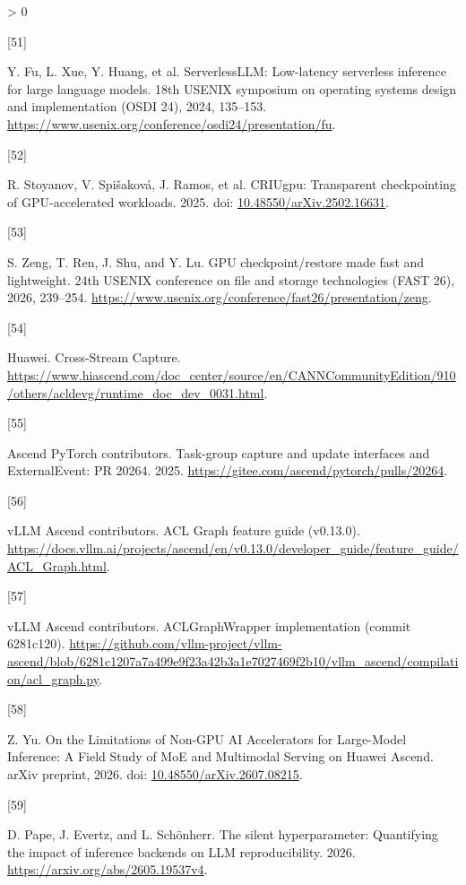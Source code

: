 \documentclass[
  11pt,
  UTF8]{ctexart}
\newlength{\cslhangindent}
\newlength{\csllabelwidth}
\newenvironment{CSLReferences}[2] %
 {%
  \setlength{\parindent}{0pt}
  \ifodd #1 \everypar{\setlength{\hangindent}{\cslhangindent}}\ignorespaces\fi
  \ifnum #2 > 0
  \setlength{\parskip}{#2\baselineskip}
  \fi
 }%
 {}
\newcommand{\CSLLeftMargin}[1]{\parbox[t]{\csllabelwidth}{#1}}
\newcommand{\CSLRightInline}[1]{\parbox[t]{\linewidth - \csllabelwidth}{#1}\break}
\begin{document}
\begin{CSLReferences}{0}{0}
\leavevmode{}%
\CSLLeftMargin{{[}51{]} }
\CSLRightInline{Y. Fu, L. Xue, Y. Huang, et al. ServerlessLLM:
Low-latency serverless inference for large language models. 18th USENIX
symposium on operating systems design and implementation (OSDI 24),
2024, 135--153.
\url{https://www.usenix.org/conference/osdi24/presentation/fu}.}

\leavevmode{}%
\CSLLeftMargin{{[}52{]} }
\CSLRightInline{R. Stoyanov, V. Spišaková, J. Ramos, et al. CRIUgpu:
Transparent checkpointing of GPU-accelerated workloads. 2025. doi:
\href{https://doi.org/10.48550/arXiv.2502.16631}{10.48550/arXiv.2502.16631}.}

\leavevmode{}%
\CSLLeftMargin{{[}53{]} }
\CSLRightInline{S. Zeng, T. Ren, J. Shu, and Y. Lu. GPU
checkpoint/restore made fast and lightweight. 24th USENIX conference on
file and storage technologies (FAST 26), 2026, 239--254.
\url{https://www.usenix.org/conference/fast26/presentation/zeng}.}

\leavevmode{}%
\CSLLeftMargin{{[}54{]} }
\CSLRightInline{Huawei. {Cross-Stream Capture}.
\url{https://www.hiascend.com/doc_center/source/en/CANNCommunityEdition/910/others/acldevg/runtime_doc_dev_0031.html}.}

\leavevmode{}%
\CSLLeftMargin{{[}55{]} }
\CSLRightInline{Ascend PyTorch contributors. {Task-group capture and
update interfaces and ExternalEvent: PR 20264}. 2025.
\url{https://gitee.com/ascend/pytorch/pulls/20264}.}

\leavevmode{}%
\CSLLeftMargin{{[}56{]} }
\CSLRightInline{vLLM Ascend contributors. {ACL Graph feature guide
(v0.13.0)}.
\url{https://docs.vllm.ai/projects/ascend/en/v0.13.0/developer_guide/feature_guide/ACL_Graph.html}.}

\leavevmode{}%
\CSLLeftMargin{{[}57{]} }
\CSLRightInline{vLLM Ascend contributors. {ACLGraphWrapper
implementation (commit 6281c120)}.
\url{https://github.com/vllm-project/vllm-ascend/blob/6281c1207a7a499e9f23a42b3a1e7027469f2b10/vllm_ascend/compilation/acl_graph.py}.}

\leavevmode{}%
\CSLLeftMargin{{[}58{]} }
\CSLRightInline{Z. Yu. {On the Limitations of Non-GPU AI Accelerators
for Large-Model Inference: A Field Study of MoE and Multimodal Serving
on Huawei Ascend}. arXiv preprint, 2026. doi:
\href{https://doi.org/10.48550/arXiv.2607.08215}{10.48550/arXiv.2607.08215}.}

\leavevmode{}%
\CSLLeftMargin{{[}59{]} }
\CSLRightInline{D. Pape, J. Evertz, and L. Schönherr. The silent
hyperparameter: Quantifying the impact of inference backends on LLM
reproducibility. 2026. \url{https://arxiv.org/abs/2605.19537v4}.}

\end{CSLReferences}
\end{document}

